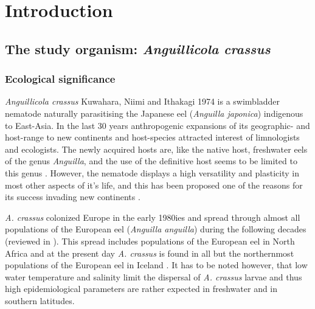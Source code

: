 

\chapter{Introduction}
\label{chap:intro}
\ifpdf
    \graphicspath{{1_introduction/figures/PNG/}{1_introduction/figures/PDF/}{1_introduction/figures/}}
\else
    \graphicspath{{1_introduction/figures/EPS/}{1_introduction/figures/}}
\fi


\section{The study organism: \textit{Anguillicola crassus}} 
\label{stud-org}

\subsection{Ecological significance} 
\label{eco-sig}

\textit{Anguillicola crassus} Kuwahara, Niimi and Ithakagi 1974
\cite{kuwahara_Niimi_Itagaki_1974} is a swimbladder nematode naturally
parasitising the Japanese eel (\textit{Anguilla japonica}) indigenous
to East-Asia. In the last 30 years anthropogenic expansions of its
geographic- and host-range to new continents and host-species
attracted interest of limnologists and ecologists. The newly acquired
hosts are, like the native host, freshwater eels of the genus
\textit{Anguilla}, and the use of the definitive host seems to be
limited to this genus \cite{sures_development_1999}. However, the
nematode displays a high versatility and plasticity in most other
aspects of it's life, and this has been proposed one of the reasons
for its success invading new continents
\cite{taraschewski_hosts_2007}.

\textit{A. crassus} colonized Europe in the early 1980ies and spread
through almost all populations of the European eel (\textit{Anguilla
  anguilla}) during the following decades (reviewed in
\cite{kirk_impact_2003}). This spread includes populations of the
European eel in North Africa
\cite{gargouri_ben_abdallah_spatio-temporal_2006,
  loukili_dynamics_2007} and at the present day \textit{A. crassus} is
found in all but the northernmost populations of the European eel in
Iceland \cite{kristmundsson_parasite_2007}. It has to be noted
however, that low water temperature \cite{knopf_impact_1998} and
salinity \cite{kirk_effect_2000} limit the dispersal of
\textit{A. crassus} larvae and thus high epidemiological parameters
are rather expected in freshwater and in southern latitudes.

